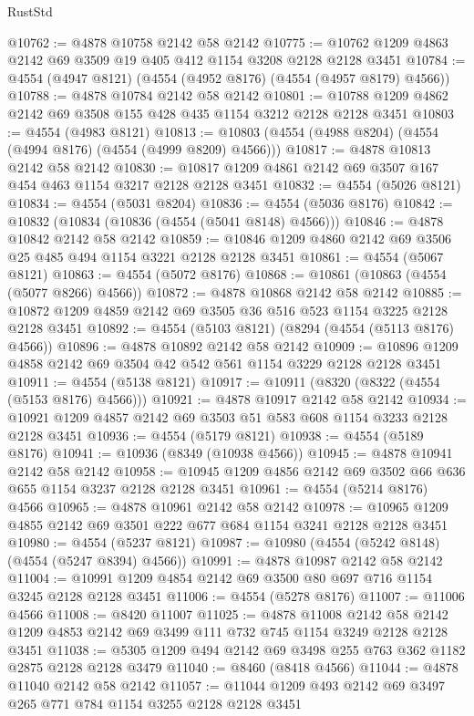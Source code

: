 \begin{lexlean}{RustStd}
\begin{coremodule}
{\begin{coremodule}
{{{{{{{{{{{{{{{{@10762 := @4878 @10758 @2142 @58 @2142
@10775 := @10762 @1209 @4863 @2142 @69 @3509 @19 @405 @412 @1154 @3208 @2128 @2128 @3451
@10784 := @4554 (@4947 @8121) (@4554 (@4952 @8176) (@4554 (@4957 @8179) @4566))
@10788 := @4878 @10784 @2142 @58 @2142
@10801 := @10788 @1209 @4862 @2142 @69 @3508 @155 @428 @435 @1154 @3212 @2128 @2128 @3451
@10803 := @4554 (@4983 @8121)
@10813 := @10803 (@4554 (@4988 @8204) (@4554 (@4994 @8176) (@4554 (@4999 @8209) @4566)))
@10817 := @4878 @10813 @2142 @58 @2142
@10830 := @10817 @1209 @4861 @2142 @69 @3507 @167 @454 @463 @1154 @3217 @2128 @2128 @3451
@10832 := @4554 (@5026 @8121)
@10834 := @4554 (@5031 @8204)
@10836 := @4554 (@5036 @8176)
@10842 := @10832 (@10834 (@10836 (@4554 (@5041 @8148) @4566)))
@10846 := @4878 @10842 @2142 @58 @2142
@10859 := @10846 @1209 @4860 @2142 @69 @3506 @25 @485 @494 @1154 @3221 @2128 @2128 @3451
@10861 := @4554 (@5067 @8121)
@10863 := @4554 (@5072 @8176)
@10868 := @10861 (@10863 (@4554 (@5077 @8266) @4566))
@10872 := @4878 @10868 @2142 @58 @2142
@10885 := @10872 @1209 @4859 @2142 @69 @3505 @36 @516 @523 @1154 @3225 @2128 @2128 @3451
@10892 := @4554 (@5103 @8121) (@8294 (@4554 (@5113 @8176) @4566))
@10896 := @4878 @10892 @2142 @58 @2142
@10909 := @10896 @1209 @4858 @2142 @69 @3504 @42 @542 @561 @1154 @3229 @2128 @2128 @3451
@10911 := @4554 (@5138 @8121)
@10917 := @10911 (@8320 (@8322 (@4554 (@5153 @8176) @4566)))
@10921 := @4878 @10917 @2142 @58 @2142
@10934 := @10921 @1209 @4857 @2142 @69 @3503 @51 @583 @608 @1154 @3233 @2128 @2128 @3451
@10936 := @4554 (@5179 @8121)
@10938 := @4554 (@5189 @8176)
@10941 := @10936 (@8349 (@10938 @4566))
@10945 := @4878 @10941 @2142 @58 @2142
@10958 := @10945 @1209 @4856 @2142 @69 @3502 @66 @636 @655 @1154 @3237 @2128 @2128 @3451
@10961 := @4554 (@5214 @8176) @4566
@10965 := @4878 @10961 @2142 @58 @2142
@10978 := @10965 @1209 @4855 @2142 @69 @3501 @222 @677 @684 @1154 @3241 @2128 @2128 @3451
@10980 := @4554 (@5237 @8121)
@10987 := @10980 (@4554 (@5242 @8148) (@4554 (@5247 @8394) @4566))
@10991 := @4878 @10987 @2142 @58 @2142
@11004 := @10991 @1209 @4854 @2142 @69 @3500 @80 @697 @716 @1154 @3245 @2128 @2128 @3451
@11006 := @4554 (@5278 @8176)
@11007 := @11006 @4566
@11008 := @8420 @11007
@11025 := @4878
    @11008
    @2142
    @58
    @2142
    @1209
    @4853
    @2142
    @69
    @3499
    @111
    @732
    @745
    @1154
    @3249
    @2128
    @2128
    @3451
@11038 := @5305 @1209 @494 @2142 @69 @3498 @255 @763 @362 @1182 @2875 @2128 @2128 @3479
@11040 := @8460 (@8418 @4566)
@11044 := @4878 @11040 @2142 @58 @2142
@11057 := @11044 @1209 @493 @2142 @69 @3497 @265 @771 @784 @1154 @3255 @2128 @2128 @3451
}}}}}}}}}}}}}}}}
\end{coremodule}}
\end{coremodule}
\end{lexlean}

